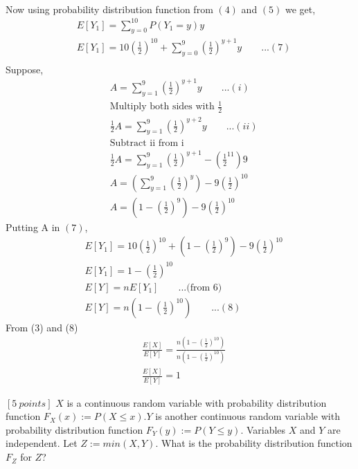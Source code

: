 \documentclass[12pt]{article}
\begin{document}
\begin{solution}
\begin{align*}
        \end{align*}
        Now using probability distribution function from $(4)$ and $(5)$ we get,
        \begin{align*}
            & E[Y_1] = \sum_{y=0}^{10}P(Y_1=y)y\\
            & E[Y_1] = 10(\frac{1}{2})^{10} + \sum_{y=0}^{9}(\frac{1}{2})^{y+1}y\quad\quad...(7) \\
        \end{align*}
        Suppose,
        \begin{align*}
            & A = \sum_{y=1}^{9}(\frac{1}{2})^{y+1}y\quad\quad...(i)\\
            & \text{Multiply both sides with $\frac{1}{2}$}\\
            & \frac{1}{2}A = \sum_{y=1}^{9}(\frac{1}{2})^{y+2}y\quad\quad...(ii)\\
            & \text{Subtract ii from i}\\
            & \frac{1}{2}A =\sum_{y=1}^{9}(\frac{1}{2})^{y+1}-(\frac{1}{2}^{11})9\\
            & A =(\sum_{y=1}^{9}(\frac{1}{2})^{y})-9(\frac{1}{2})^{10}\\
            & A =(1-(\frac{1}{2})^{9})-9(\frac{1}{2})^{10}
        \end{align*}
        Putting A in $(7)$,\\
        \begin{align*}
            & E[Y_1]  = 10(\frac{1}{2})^{10} + (1-(\frac{1}{2})^{9})-9(\frac{1}{2})^{10}\\
            & E[Y_1] = 1-(\frac{1}{2})^{10}\\
            & E[Y] = nE[Y_1]\quad\quad...\text{(from 6)}\\
            & E[Y] =  n(1-(\frac{1}{2})^{10})\quad\quad...(8)
        \end{align*}
        From (3) and (8)
        \begin{align*}
            &\frac{E[X]}{E[Y]}=\frac{n(1-(\frac{1}{2})^{10})}{n(1-(\frac{1}{2})^{10})}\\
            &\frac{E[X]}{E[Y]}=1
        \end{align*}
        
    \end{solution}

    \begin{question}
        $[5 \: points]$ $X$ is a continuous random variable with probability distribution function $F_X(x) := P(X \leq x). Y$ is another continuous random variable with probability distribution function $F_Y(y) := P(Y \leq y)$. Variables $X$ and $Y$ are independent. Let $Z := min(X,Y).$ What is the probability distribution function $F_Z$ for $Z$?
    \end{question}
    
\end{document}
